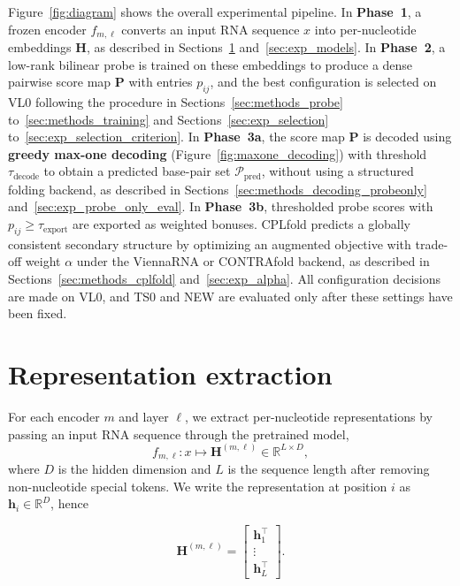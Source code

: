 \documentclass[logo,bsc,singlespacing,parskip]{infthesis}
\begin{document}
Figure~\ref{fig:diagram} shows the overall experimental pipeline. In \textbf{Phase~1}, a frozen encoder $f_{m,\ell}$ converts an input RNA sequence $x$ into per-nucleotide embeddings $\mathbf{H}$, as described in Sections~\ref{sec:methods_embeddings} and~\ref{sec:exp_models}. In \textbf{Phase~2}, a low-rank bilinear probe is trained on these embeddings to produce a dense pairwise score map $\mathbf{P}$ with entries $p_{ij}$, and the best configuration is selected on VL0 following the procedure in Sections~\ref{sec:methods_probe} to~\ref{sec:methods_training} and Sections~\ref{sec:exp_selection} to~\ref{sec:exp_selection_criterion}. In \textbf{Phase~3a}, the score map $\mathbf{P}$ is decoded using \textbf{greedy max-one decoding} (Figure~\ref{fig:maxone_decoding}) with threshold $\tau_{\mathrm{decode}}$ to obtain a predicted base-pair set $\mathcal{P}_{\mathrm{pred}}$, without using a structured folding backend, as described in Sections~\ref{sec:methods_decoding_probeonly} and~\ref{sec:exp_probe_only_eval}. In \textbf{Phase~3b}, thresholded probe scores with $p_{ij} \ge \tau_{\mathrm{export}}$ are exported as weighted bonuses. CPLfold predicts a globally consistent secondary structure by optimizing an augmented objective with trade-off weight $\alpha$ under the ViennaRNA or CONTRAfold backend, as described in Sections~\ref{sec:methods_cplfold} and~\ref{sec:exp_alpha}. All configuration decisions are made on VL0, and TS0 and NEW are evaluated only after these settings have been fixed.

\section{Representation extraction}
\label{sec:methods_embeddings}

For each encoder \(m\) and layer \(\ell\), we extract per-nucleotide
representations by passing an input RNA sequence through the
pretrained model,
\begin{equation}
f_{m,\ell}: x \mapsto \mathbf{H}^{(m,\ell)} \in \mathbb{R}^{L \times D},
\end{equation}
where \(D\) is the hidden dimension and \(L\) is the sequence length
after removing non-nucleotide special tokens. We write the
representation at position \(i\) as \(\mathbf{h}_i\in\mathbb{R}^D\), hence

\begin{equation}
\mathbf{H}^{(m,\ell)} =
\begin{bmatrix}
\mathbf{h}_1^\top\\
\vdots\\
\mathbf{h}_{L}^\top
\end{bmatrix}.
\end{equation}
\end{document}
